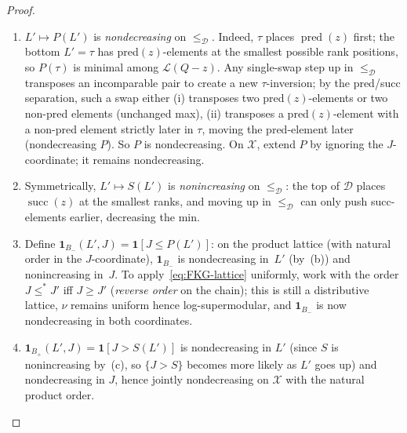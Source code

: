 \begin{proof}
\begin{enumerate}[label=(\alph*),nosep]
 \item $L' \mapsto P(L')$ is \emph{nondecreasing} on $\le_{\mathcal D}$.
 Indeed, $\tau$ places $\operatorname{pred}(z)$ first; the bottom
 $L' = \tau$ has pred$(z)$-elements at the smallest possible rank
 positions, so $P(\tau)$ is minimal among $\mathcal L(Q-z)$. Any
 single-swap step up in $\le_{\mathcal D}$ transposes an incomparable
 pair to create a new $\tau$-inversion; by the pred/succ separation,
 such a swap either (i) transposes two pred$(z)$-elements or two
 non-pred elements (unchanged max), (ii) transposes a
 pred$(z)$-element with a non-pred element strictly later in $\tau$,
 moving the pred-element later (nondecreasing $P$). So $P$ is
 nondecreasing. On $\mathcal X$, extend $P$ by ignoring the
 $J$-coordinate; it remains nondecreasing.

 \item Symmetrically, $L' \mapsto S(L')$ is \emph{nonincreasing} on
 $\le_{\mathcal D}$: the top of $\mathcal D$ places
 $\operatorname{succ}(z)$ at the smallest ranks, and moving up in
 $\le_{\mathcal D}$ can only push succ-elements earlier, decreasing
 the min.

 \item Define $\mathbf{1}_{B_-}(L', J) = \mathbf{1}[J \le P(L')]$: on
 the product lattice (with natural order in the $J$-coordinate),
 $\mathbf{1}_{B_-}$ is nondecreasing in~$L'$ (by~(b)) and
 nonincreasing in~$J$. To apply~\eqref{eq:FKG-lattice} uniformly,
 work with the order $J \le^* J'$ iff $J \ge J'$ (\emph{reverse
 order} on the chain); this is still a distributive lattice, $\nu$
 remains uniform hence log-supermodular, and
 $\mathbf{1}_{B_-}$ is now nondecreasing in both coordinates.

 \item $\mathbf{1}_{B_+}(L', J) = \mathbf{1}[J > S(L')]$ is
 nondecreasing in $L'$ (since $S$ is nonincreasing by~(c), so
 $\{J > S\}$ becomes more likely as $L'$ goes up) and nondecreasing
 in $J$, hence jointly nondecreasing on $\mathcal X$ with the natural
 product order.
\end{enumerate}


\end{proof}
